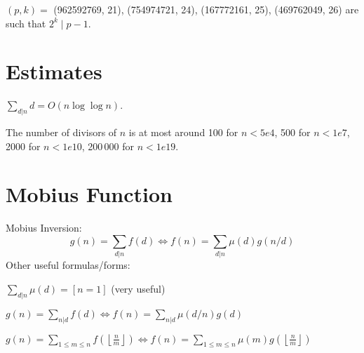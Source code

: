 	$(p, k) =$ (962592769, 21), (754974721, 24), (167772161, 25), (469762049, 26)
	are such that $2^k \mid p - 1$.


\section{Estimates}
	$\sum_{d|n} d = O(n \log \log n)$.

	The number of divisors of $n$ is at most around 100 for $n < 5e4$, 500 for $n < 1e7$, 2000 for $n < 1e10$, 200\,000 for $n < 1e19$.

\section{Mobius Function}
  Mobius Inversion:
  \[ g(n) = \sum_{d|n} f(d) \Leftrightarrow f(n) = \sum_{d|n} \mu(d)g(n/d) \]
  Other useful formulas/forms:

  $ \sum_{d | n} \mu(d) = [ n = 1] $ (very useful)

  $ g(n) = \sum_{n|d} f(d) \Leftrightarrow f(n) = \sum_{n|d} \mu(d/n)g(d)$

 $ g(n) = \sum_{1 \leq m \leq n} f(\left\lfloor\frac{n}{m}\right \rfloor ) \Leftrightarrow f(n) = \sum_{1\leq m\leq n} \mu(m)g(\left\lfloor\frac{n}{m}\right\rfloor)$
